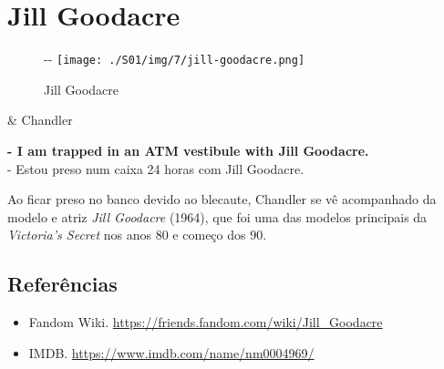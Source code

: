 \hypertarget{jill-goodacre}{%
\section{Jill Goodacre}\label{jill-goodacre}}

\begin{figure}[!ht]
  \begin{adjustwidth}{-\oddsidemargin-1in}{-\rightmargin}
    \centering
    \texttt{[image: ./S01/img/7/jill-goodacre.png]}
    \caption{Jill Goodacre\label{fig:jill-goodacre}}
  \end{adjustwidth}
\end{figure}

\begin{tcolorbox}[enhanced,center upper,
    drop fuzzy shadow southeast, boxrule=0.3pt,
    lower separated=false,
    colframe=black!30!dialogoBorder,colback=white]
\begin{minipage}[c]{0.14\linewidth}
   & \centering \scriptsize{Chandler}
\end{minipage}
\hspace{.1mm}
\begin{minipage}[c]{0.8\linewidth}
  \textbf{- I am trapped in an ATM vestibule with Jill Goodacre.}\\
  - Estou preso num caixa 24 horas com Jill Goodacre.
\end{minipage}
\end{tcolorbox}

Ao ficar preso no banco devido ao blecaute, Chandler se vê acompanhado
da modelo e atriz \emph{Jill Goodacre} (1964), que foi uma das modelos
principais da \emph{Victoria's Secret} nos anos 80 e começo dos 90.

\hypertarget{referuxeancias}{%
\subsection{Referências}\label{referuxeancias}}

\begin{itemize}
\tightlist
\item
  \sloppy Fandom Wiki. \url{https://friends.fandom.com/wiki/Jill_Goodacre}
\item
  \sloppy IMDB. \url{https://www.imdb.com/name/nm0004969/}
\end{itemize}


